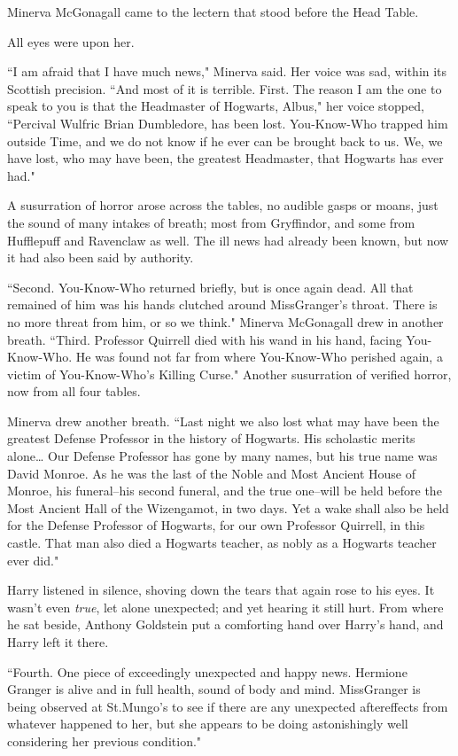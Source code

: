 Minerva McGonagall came to the lectern that stood before the Head Table.

All eyes were upon her.

``I am afraid that I have much news," Minerva said. Her voice was sad, within its Scottish precision. ``And most of it is terrible. First. The reason I am the one to speak to you is that the Headmaster of Hogwarts, Albus," her voice stopped, ``Percival Wulfric Brian Dumbledore, has been lost. You-Know-Who trapped him outside Time, and we do not know if he ever can be brought back to us. We, we have lost, who may have been, the greatest Headmaster, that Hogwarts has ever had."

A susurration of horror arose across the tables, no audible gasps or moans, just the sound of many intakes of breath; most from Gryffindor, and some from Hufflepuff and Ravenclaw as well. The ill news had already been known, but now it had also been said by authority.

``Second. You-Know-Who returned briefly, but is once again dead. All that remained of him was his hands clutched around Miss\?Granger's throat. There is no more threat from him, or so we think." Minerva McGonagall drew in another breath. ``Third. Professor Quirrell died with his wand in his hand, facing You-Know-Who. He was found not far from where You-Know-Who perished again, a victim of You-Know-Who's Killing Curse." Another susurration of verified horror, now from all four tables.

Minerva drew another breath. ``Last night we also lost what may have been the greatest Defense Professor in the history of Hogwarts. His scholastic merits alone{\ldots} Our Defense Professor has gone by many names, but his true name was David Monroe. As he was the last of the Noble and Most Ancient House of Monroe, his funeral\---his second funeral, and the true one\---will be held before the Most Ancient Hall of the Wizengamot, in two days. Yet a wake shall also be held for the Defense Professor of Hogwarts, for our own Professor Quirrell, in this castle. That man also died a Hogwarts teacher, as nobly as a Hogwarts teacher ever did."

Harry listened in silence, shoving down the tears that again rose to his eyes. It wasn't even \emph{true}, let alone unexpected; and yet hearing it still hurt. From where he sat beside, Anthony Goldstein put a comforting hand over Harry's hand, and Harry left it there.

``Fourth. One piece of exceedingly unexpected and happy news. Hermione Granger is alive and in full health, sound of body and mind. Miss\?Granger is being observed at St.\?Mungo's to see if there are any unexpected aftereffects from whatever happened to her, but she appears to be doing astonishingly well considering her previous condition."

